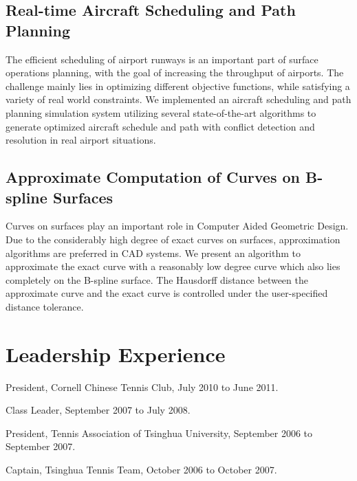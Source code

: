 \documentclass[10pt,letterpaper]{article}
\renewenvironment{itemize}{
  \begin{list}{}{
    \setlength{\leftmargin}{1.5em}
    \setlength{\itemsep}{0.25em}
    \setlength{\parskip}{0pt}
    \setlength{\parsep}{0.25em}
  }
}{
  \end{list}
}
\begin{document}
\subsection*{Real-time Aircraft Scheduling and Path Planning}
\begin{itemize}
\item The efficient scheduling of airport runways is an important part of surface operations planning, with the goal of increasing the throughput of airports. The challenge mainly lies in optimizing different objective functions, while satisfying a variety of real world constraints. We implemented an aircraft scheduling and path planning simulation system utilizing several state-of-the-art algorithms to generate optimized aircraft schedule and path with conflict detection and resolution in real airport situations.
\end{itemize}

\subsection*{Approximate Computation of Curves on B-spline Surfaces}
\begin{itemize}
\item Curves on surfaces play an important role in Computer Aided Geometric Design. Due to the considerably high degree of exact curves on surfaces, approximation algorithms are preferred in CAD systems. We present an algorithm to approximate the exact curve with a reasonably low degree curve which also lies completely on the B-spline surface. The Hausdorff distance between the approximate curve and the exact curve is controlled under the user-specified distance tolerance.
\end{itemize}

\section*{Leadership Experience}
\begin{itemize}
\item President, Cornell Chinese Tennis Club, July 2010 to June 2011.
\item Class Leader, September 2007 to July 2008.
\item President, Tennis Association of Tsinghua University, September 2006 to September 2007.
\item Captain, Tsinghua Tennis Team, October 2006 to October 2007.
\end{itemize}
\end{document}

